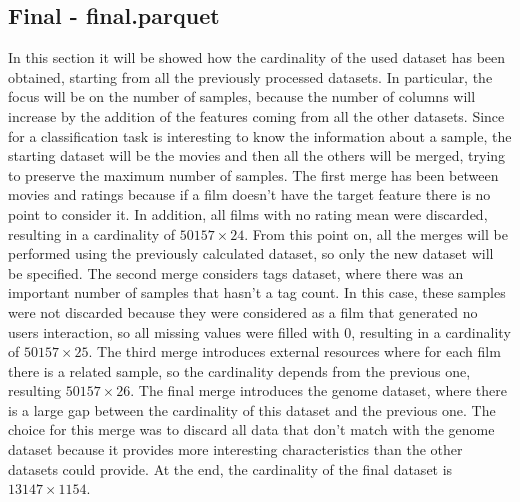 \documentclass[../main]{subfiles}
\begin{document}
\subsection*{Final - final.parquet}
In this section it will be showed how the cardinality of the used dataset has been obtained, starting from all the previously processed datasets.
In particular, the focus will be on the number of samples, because the number of columns will increase by the addition of the features coming from all the other datasets.
Since for a classification task is interesting to know the information about a sample, the starting dataset will be the movies and then all the others will be merged, trying to preserve the maximum number of samples.
The first merge has been between movies and ratings because if a film doesn’t have the target feature there is no point to consider it.
In addition, all films with no rating mean were discarded, resulting in a cardinality of $50157 \times 24$.
From this point on, all the merges will be performed using the previously calculated dataset, so only the new dataset will be specified.
The second merge considers tags dataset, where there was an important number of samples that hasn't a tag count.
In this case, these samples were not discarded because they were considered as a film that generated no users interaction, so all missing values were filled with 0, resulting in a cardinality of $50157 \times 25$.
The third merge introduces external resources where for each film there is a related sample, so the cardinality depends from the previous one, resulting $50157 \times 26$.
The final merge introduces the genome dataset, where there is a large gap between the cardinality of this dataset and the previous one.
The choice for this merge was to discard all data
that don't match with the genome dataset because it provides more interesting characteristics than the other datasets could provide.
At the end, the cardinality of the final dataset is $13147 \times 1154$.
\end{document}
